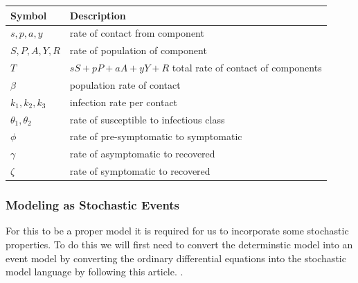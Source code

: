 \documentclass{article}
\begin{document}
\begin{center}
	\begin{tabular}{|l|l|}
		\hline
		Symbol                 & Description                                                \\ [0.5ex]
		\hline\hline
		$s, p, a, y$           & rate of contact from component                             \\
		\hline
		$S, P, A, Y, R$        & rate of population of component                            \\
		\hline
		$T$                    & $sS+ pP + aA + yY + R$ total rate of contact of components \\
		\hline
		$\beta$                & population rate of contact                                 \\
		\hline
		$k_1, k_2, k_3$        & infection rate per contact                                 \\
		\hline
		$\theta _1 , \theta_2$ & rate of susceptible to infectious class                    \\
		\hline
		$\phi$                 & rate of pre-symptomatic to symptomatic                     \\
		\hline
		$\gamma$               & rate of asymptomatic to recovered                          \\
		\hline
		$\zeta$                & rate of symptomatic to recovered                           \\
		\hline
	\end{tabular}
\end{center}


\subsubsection{Modeling as Stochastic Events}
For this to be a proper model it is required for us to incorporate some stochastic properties. To do this we will first need to convert the determinstic model into an event model by converting the ordinary differential equations into the stochastic model language by following this article. \cite{events}.
\end{document}
